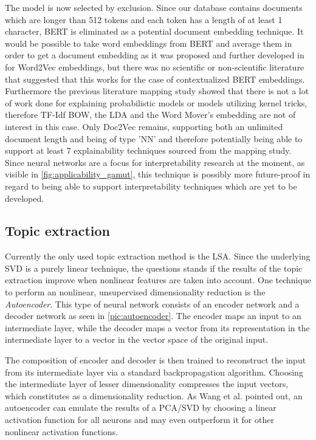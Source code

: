 The model is now selected by exclusion. Since our database contains documents which are longer than 512 tokens and each token has a length of at least 1 character, BERT is eliminated as a potential document embedding technique. It would be possible to take word embeddings from BERT and average them in order to get a document embedding as it was proposed and further developed in \cite{deboomRepresentationLearningVery2016} for Word2Vec embeddings, but there was no scientific or non-scientific literature that suggested that this works for the case of contextualized BERT embeddings.
Furthermore the previous literature mapping study showed that there is not a lot of work done for explaining probabilistic models or models utilizing kernel tricks, therefore TF-Idf BOW, the LDA and the Word Mover's embedding are not of interest in this case. Only Doc2Vec remains, supporting both an unlimited document length and being of type 'NN' and therefore potentially being able to support at least 7 explainability techniques sourced from the mapping study. Since neural networks are a focus for interpretability research at the moment, as visible in \autoref{fig:applicability_gamut}, this technique is possibly more future-proof in regard to being able to support interpretability techniques which are yet to be developed.

\subsection{Topic extraction}

Currently the only used topic extraction method is the LSA. Since the underlying SVD is a purely linear technique, the questions stands if the results of the topic extraction improve when nonlinear features are taken into account. One technique to perform an nonlinear, unsupervised dimensionality reduction is the \textit{Autoencoder}. This type of neural network consists of an encoder network and a decoder network as seen in \autoref{pic:autoencoder}. The encoder maps an input to an intermediate layer, while the decoder maps a vector from its representation in the intermediate layer to a vector in the vector space of the original input.

The composition of encoder and decoder is then trained to reconstruct the input from its intermediate layer via a standard backpropagation algorithm. Choosing the intermediate layer of lesser dimensionality compresses the input vectors, which constitutes as a dimensionality reduction. As Wang et al. \cite{wangAutoencoderBasedDimensionality2016} pointed out, an autoencoder can emulate the results of a PCA/SVD by choosing a linear activation function for all neurons and may even outperform it for other nonlinear activation functions.

